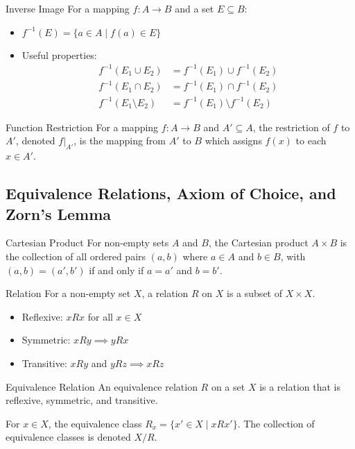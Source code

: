 \begin{definitionbox}{Inverse Image}
For a mapping $f: A \to B$ and a set $E \subseteq B$:
\begin{itemize}
    \item $f^{-1}(E) = \{a \in A \mid f(a) \in E\}$
    \item Useful properties:
    \begin{align*}
        f^{-1}(E_1 \cup E_2) &= f^{-1}(E_1) \cup f^{-1}(E_2) \\
        f^{-1}(E_1 \cap E_2) &= f^{-1}(E_1) \cap f^{-1}(E_2) \\
        f^{-1}(E_1 \setminus E_2) &= f^{-1}(E_1) \setminus f^{-1}(E_2)
    \end{align*}
\end{itemize}
\end{definitionbox}

\begin{definitionbox}{Function Restriction}
For a mapping $f: A \to B$ and $A' \subseteq A$, the restriction of $f$ to $A'$, denoted $f\big|_{A'}$, is the mapping from $A'$ to $B$ which assigns $f(x)$ to each $x \in A'$.
\end{definitionbox}

\subsection{Equivalence Relations, Axiom of Choice, and Zorn's Lemma}

\begin{definitionbox}{Cartesian Product}
For non-empty sets $A$ and $B$, the Cartesian product $A \times B$ is the collection of all ordered pairs $(a,b)$ where $a \in A$ and $b \in B$, with $(a,b) = (a',b')$ if and only if $a = a'$ and $b = b'$.
\end{definitionbox}

\begin{definitionbox}{Relation}
For a non-empty set $X$, a relation $R$ on $X$ is a subset of $X \times X$. 
\begin{itemize}
    \item Reflexive: $xRx$ for all $x \in X$
    \item Symmetric: $xRy \implies yRx$
    \item Transitive: $xRy$ and $yRz \implies xRz$
\end{itemize}
\end{definitionbox}

\begin{definitionbox}{Equivalence Relation}
An equivalence relation $R$ on a set $X$ is a relation that is reflexive, symmetric, and transitive.

For $x \in X$, the equivalence class $R_x = \{x' \in X \mid xRx'\}$. 
The collection of equivalence classes is denoted $X/R$.
\end{definitionbox}

